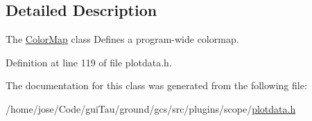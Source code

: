 \subsection{Detailed Description}
The \hyperlink{class_color_map}{Color\-Map} class Defines a program-\/wide colormap. 

Definition at line 119 of file plotdata.\-h.



The documentation for this class was generated from the following file\-:\begin{DoxyCompactItemize}
\item 
/home/jose/\-Code/gui\-Tau/ground/gcs/src/plugins/scope/\hyperlink{plotdata_8h}{plotdata.\-h}\end{DoxyCompactItemize}
